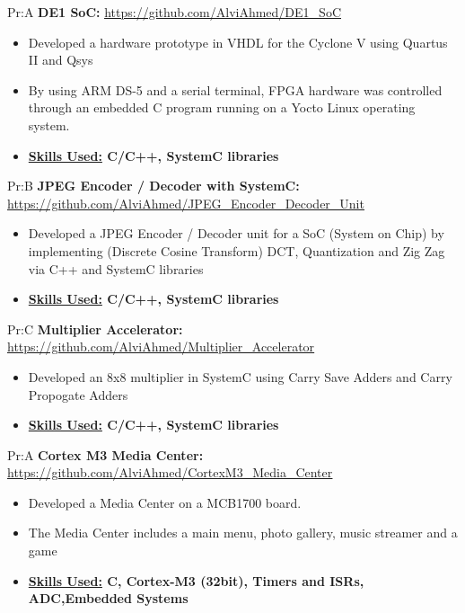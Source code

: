 Pr:A
\vspace{\spaces}
\textbf{DE1 SoC: }
\underline{\url{https://github.com/AlviAhmed/DE1_SoC}}
\begin{itemize}[noitemsep,nolistsep]
\item Developed a hardware prototype in VHDL for the Cyclone V using Quartus II and Qsys
\item By using ARM DS-5 and a serial terminal, FPGA hardware was controlled through an embedded C program running on a Yocto Linux operating system.
\item \textbf{\underline{Skills Used:} C/C++, SystemC libraries}
\end{itemize}


Pr:B
\vspace{\spaces}
\textbf{JPEG Encoder / Decoder with SystemC: }
\underline{\url{https://github.com/AlviAhmed/JPEG_Encoder_Decoder_Unit}}
\begin{itemize}[noitemsep,nolistsep]
\item Developed a JPEG Encoder / Decoder unit for a SoC (System on Chip) by implementing
  (Discrete Cosine Transform) DCT, Quantization and Zig Zag via C++ and SystemC libraries
\item \textbf{\underline{Skills Used:} C/C++, SystemC libraries}
\end{itemize}


Pr:C
\vspace{\spaces}
\textbf{Multiplier Accelerator: }
\underline{\url{https://github.com/AlviAhmed/Multiplier_Accelerator}}
\begin{itemize}[noitemsep,nolistsep]
\item Developed an 8x8 multiplier in SystemC using Carry Save Adders and Carry Propogate Adders
\item \textbf{\underline{Skills Used:} C/C++, SystemC libraries}
\end{itemize}


Pr:A
\vspace{\spaces}
\textbf{Cortex M3 Media Center: } 
\underline{\url{https://github.com/AlviAhmed/CortexM3_Media_Center}}
\begin{itemize}[noitemsep,nolistsep]
\item Developed a Media Center on a MCB1700 board.
\item The Media Center includes a main menu, photo gallery, music streamer and a game 
\item \textbf{ \underline{Skills Used:} C, Cortex-M3 (32bit), Timers and ISRs, ADC,Embedded Systems}
\end{itemize}

